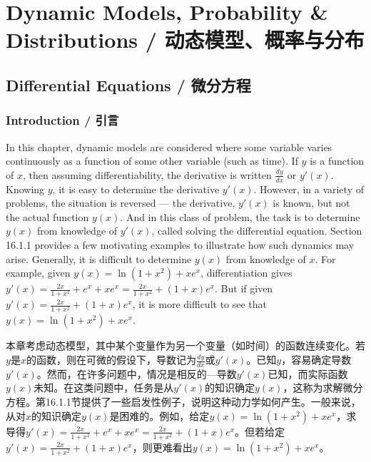 
\part{Dynamic Models, Probability \& Distributions / 动态模型、概率与分布}

\chapter{Differential Equations / 微分方程}

\section{Introduction / 引言}

\begin{original}
In this chapter, dynamic models are considered where some variable varies continuously as a function of some other variable (such as time). If $y$ is a function of $x$, then assuming differentiability, the derivative is written $\frac{dy}{dx}$ or $y'(x)$. Knowing $y$, it is easy to determine the derivative $y'(x)$. However, in a variety of problems, the situation is reversed --- the derivative, $y'(x)$ is known, but not the actual function $y(x)$. And in this class of problem, the task is to determine $y(x)$ from knowledge of $y'(x)$, called solving the differential equation. Section 16.1.1 provides a few motivating examples to illustrate how such dynamics may arise. Generally, it is difficult to determine $y(x)$ from knowledge of $x$. For example, given $y(x) = \ln(1 + x^2) + xe^x$, differentiation gives $y'(x) = \frac{2x}{1+x^2} + e^x + xe^x = \frac{2x}{1+x^2} + (1 + x)e^x$. But if given $y'(x) = \frac{2x}{1+x^2} + (1 + x)e^x$, it is more difficult to see that $y(x) = \ln(1 + x^2) + xe^x$.
\end{original}
\begin{translation}
本章考虑动态模型，其中某个变量作为另一个变量（如时间）的函数连续变化。若$y$是$x$的函数，则在可微的假设下，导数记为$\frac{dy}{dx}$或$y'(x)$。已知$y$，容易确定导数$y'(x)$。然而，在许多问题中，情况是相反的---导数$y'(x)$已知，而实际函数$y(x)$未知。在这类问题中，任务是从$y'(x)$的知识确定$y(x)$，这称为求解微分方程。第16.1.1节提供了一些启发性例子，说明这种动力学如何产生。一般来说，从对$x$的知识确定$y(x)$是困难的。例如，给定$y(x) = \ln(1 + x^2) + xe^x$，求导得$y'(x) = \frac{2x}{1+x^2} + e^x + xe^x = \frac{2x}{1+x^2} + (1 + x)e^x$。但若给定$y'(x) = \frac{2x}{1+x^2} + (1 + x)e^x$，则更难看出$y(x) = \ln(1 + x^2) + xe^x$。
\end{translation}

